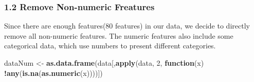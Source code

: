 \documentclass[]{article}
\newenvironment{Shaded}{\begin{snugshade}}{\end{snugshade}}
\newcommand{\KeywordTok}[1]{\textcolor[rgb]{0.13,0.29,0.53}{\textbf{#1}}}
\newcommand{\DecValTok}[1]{\textcolor[rgb]{0.00,0.00,0.81}{#1}}
\newcommand{\StringTok}[1]{\textcolor[rgb]{0.31,0.60,0.02}{#1}}
\newcommand{\ControlFlowTok}[1]{\textcolor[rgb]{0.13,0.29,0.53}{\textbf{#1}}}
\newcommand{\OperatorTok}[1]{\textcolor[rgb]{0.81,0.36,0.00}{\textbf{#1}}}
\newcommand{\NormalTok}[1]{#1}
\begin{document}
\subsubsection{1.2 Remove Non-numeric
Freatures}\label{remove-non-numeric-freatures}

Since there are enough features(80 features) in our data, we decide to
directly remove all non-numeric features. The numeric features also
include some categorical data, which use numbers to present different
categories.

\begin{Shaded}
\begin{Highlighting}[]
\NormalTok{dataNum <-}\StringTok{ }\KeywordTok{as.data.frame}\NormalTok{(data[,}\KeywordTok{apply}\NormalTok{(data, }\DecValTok{2}\NormalTok{, }\ControlFlowTok{function}\NormalTok{(x) }\OperatorTok{!}\KeywordTok{any}\NormalTok{(}\KeywordTok{is.na}\NormalTok{(}\KeywordTok{as.numeric}\NormalTok{(x))))])}
\end{Highlighting}
\end{Shaded}
\end{document}
